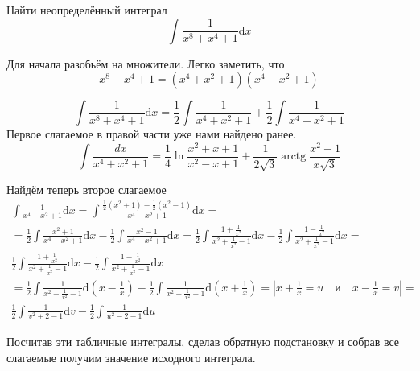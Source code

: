 Найти неопределённый интеграл
\begin{equation}
		\int \frac{1}{x^8+x^4+1}\mathrm{d}x
\end{equation}

Для начала разобьём на множители. Легко заметить, что 
\[ x^8+x^4+1=\left(x^4+x^2+1\right)\left(x^4-x^2+1\right)
\]

\[
\int \frac{1}{x^8+x^4+1}\mathrm{d}x = \frac{1}{2}\int \frac{1}{x^4+x^2+1} +\frac{1}{2}\int \frac{1}{x^4-x^2+1}
\]
Первое слагаемое в правой части уже нами найдено ранее.
\[	\int \frac{d x}{x^{4}+x^{2}+1}=\frac{1}{4} \ln \frac{x^{2}+x+1}{x^{2}-x+1}+\frac{1}{2 \sqrt{3}} \operatorname{arctg} \frac{x^{2}-1}{x \sqrt{3}}	
\]

Найдём теперь второе слагаемое
\[
\begin{aligned}
\int \frac{1}{x^4-x^2+1}\mathrm{d}x=\int \frac{\frac{1}{2}\left(x^{2}+1\right)-\frac{1}{2}\left(x^{2}-1\right)}{x^4-x^2+1}\mathrm{d}x=\\=\frac{1}{2}\int \frac{x^2+1}{x^4-x^2+1}\mathrm{d}x - \frac{1}{2}\int \frac{x^2-1}{x^4-x^2+1}\mathrm{d}x=\frac{1}{2}\int \frac{1+\frac{1}{x^2}}{x^2+\frac{1}{x^2}-1}\mathrm{d}x-\frac{1}{2}\int \frac{1-\frac{1}{x^2}}{x^2+\frac{1}{x^2}-1}\mathrm{d}x=\\\frac{1}{2}\int \frac{1+\frac{1}{x^2}}{x^2+\frac{1}{x^2}-1}\mathrm{d}x-\frac{1}{2}\int \frac{1-\frac{1}{x^2}}{x^2+\frac{1}{x^2}-1}\mathrm{d}x\\=\frac{1}{2}\int \frac{1}{x^2+\frac{1}{x^2}-1}\mathrm{d}\left(x-\frac{1}{x}\right)-\frac{1}{2}\int \frac{1}{x^2+\frac{1}{x^2}-1}\mathrm{d}\left(x+\frac{1}{x}\right)=\left|	x+\frac{1}{x}=u \quad \text{и} \quad x-\frac{1}{x}=v\right|=\\\frac{1}{2}\int \frac{1}{v^2+2-1}\mathrm{d}v-\frac{1}{2}\int \frac{1}{u^2-2-1}\mathrm{d}u
\end{aligned}
\]

Посчитав эти табличные интегралы, сделав обратную подстановку и собрав все слагаемые получим значение исходного интеграла.
